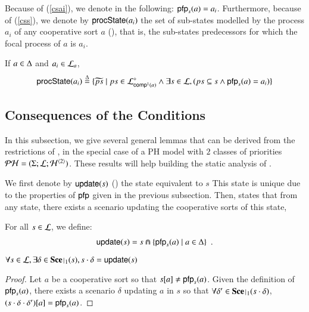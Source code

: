 Because of (\ref{csai}), we denote in the following: $\pfp_s(a) = a_i$.
Furthermore, because of (\ref{css}), we denote by $\csState(a_i)$ the set of sub-states modelled by the process $a_i$ of any cooperative sort $a$ (),
that is, the sub-states predecessors for which the focal process of $a$ is $a_i$.
\begin{definition}[$\csState : \PHproc \rightarrow \powerset(\PHproc)$]
\label{def:csState}
  If $a \in \cs$ and $a_i \in \PHl_a$, 
  $$\csState(a_i) \DEF \{ \toset{ps} \mid ps\in\PHsubl[\PHl]_{\compin(a)} \wedge
  							\exists s\in\PHl, (ps\subseteq s\wedge \pfp_s(a)=a_i)
							\}$$
\end{definition}

%



\subsection{Consequences of the Conditions}

In this subsection, we give several general lemmas that can be derived from the restrictions of ,
in the special case of a PH model with $2$ classes of priorities $\PH = (\PHs; \PHl; \PHa^{\langle 2 \rangle})$.
These results will help building the static analysis of .

We first denote by $\update(s)$ () the state equivalent to $s$
%
This state is unique due to the properties of $\pfp$ given in the previous subsection.
Then,  states that from any state, there exists a scenario updating the cooperative sorts of this state,
%

\begin{definition}[$\update : \PHl \rightarrow \PHl$]
\label{def:update}
  For all $s \in \PHl$, we define:
  \begin{align*}
    \update(s) = s \Cap \{ \pfp_{s}(a) \mid a \in \cs \} \enspace.
  \end{align*}
\end{definition}
%
\begin{lemma}
\label{lem:update}
  $\forall s \in \PHl, \exists \delta \in \restriction{\Sce}{1}(s), s \PHplay \delta = \update(s)$
\end{lemma}
%
\begin{proof}
  Let $a$ be a cooperative sort so that $\PHget{s}{a} \neq \pfp_s(a)$.
  Given the definition of $\pfp_s(a)$, there exists a scenario $\delta$ updating $a$ in $s$ so that
  $\forall \delta' \in \restriction{\Sce}{1}(s \PHplay \delta)$, $\PHget{(s \PHplay \delta \PHplay \delta')}{a} = \pfp_s(a)$.
\end{proof}


